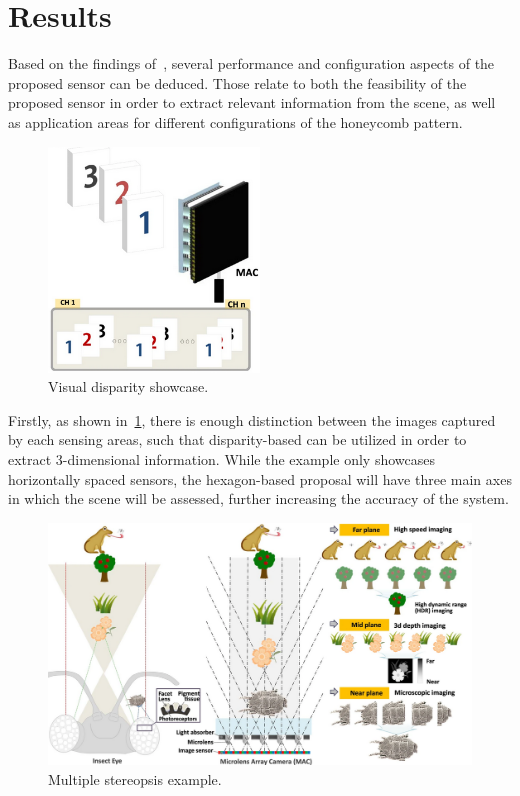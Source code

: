 \section{Results}

Based on the findings of~\cite{withInsects}, several performance and configuration aspects of the 
proposed sensor can be deduced. Those relate to both the feasibility of the proposed sensor in order
to extract relevant information from the scene, as well as application areas for different configurations
of the honeycomb pattern.

\begin{figure}[t]
    \includegraphics[width=0.50\textwidth, height=0.50\textwidth]{resources/png/paper_result.png}
    \caption{Visual disparity showcase.~\cite{withInsects}~\label{figResults}}
\end{figure}

Firstly, as shown in~\ref{figResults}, there is enough distinction
between the images captured by each sensing areas, such that disparity-based can be utilized in order
to extract 3-dimensional information. While the example only showcases horizontally spaced sensors, 
the hexagon-based proposal will have three main axes in which the scene will be assessed, further
increasing the accuracy of the system.

\begin{figure}[t]
    \includegraphics[width=1.0\textwidth, height=0.50\textwidth]{resources/png/paper_working.png}
    \caption{Multiple stereopsis example.~\cite{withInsects}~\label{figWorking}}
\end{figure}


